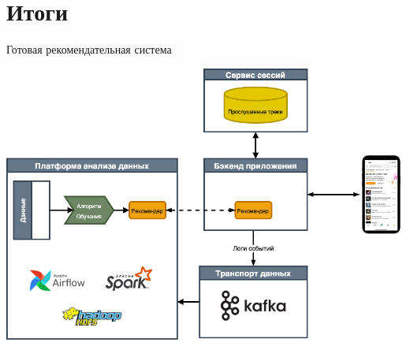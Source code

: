 \documentclass[11pt,aspectratio=169,handout]{beamer}
\begin{document}
{
\begin{frame}[plain]
\end{frame}
}

\section{Итоги}

{
\begin{frame}[plain]
\end{frame}
}

\begin{frame}{Готовая рекомендательная система}
\begin{center}
\includegraphics[scale=0.3]{images/architecture.png}
\end{center}
\end{frame}
\end{document}
